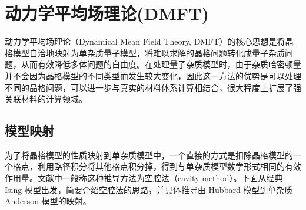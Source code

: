 \chapter{动力学平均场理论(DMFT)}
动力学平均场理论（Dynamical Mean Field Theory, DMFT）的核心思想是将晶格模型自洽地映射为单杂质量子模型，将难以求解的晶格问题转化成量子杂质问题，从而有效降低多体问题的自由度。在处理量子杂质模型时，由于杂质哈密顿量并不会因为晶格模型的不同类型而发生较大变化，因此这一方法的优势是可以处理不同的晶格问题，可以进一步与真实的材料体系计算相结合，很大程度上扩展了强关联材料的计算领域。
\section{模型映射}
为了将晶格模型的性质映射到单杂质模型中，一个直接的方式是扣除晶格模型的一个格点，利用路径积分将其他格点积分掉，得到与单杂质模型数学形式相同的有效作用量。文献中一般称这种推导方法为空腔法（cavity method）\cite{RevModPhys.68.13}。下面从经典 Ising 模型出发，简要介绍空腔法的思路，并具体推导由 Hubbard 模型到单杂质 Anderson 模型的映射。
